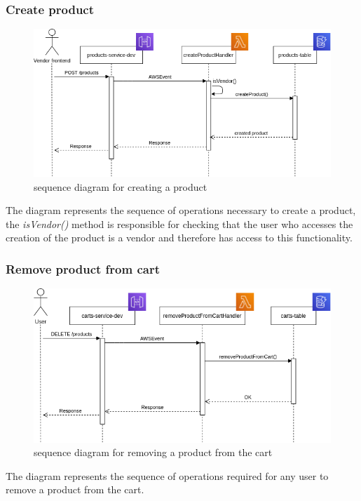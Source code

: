 \subsubsection{Create product}
\begin{figure}[!h]
    \vspace{5px}
    \includegraphics[scale=0.5]{../../../../Images/Diagrammi/maintainerManual/createProductSequence.png}
    \centering
    \caption{sequence diagram for creating a product} 
\end{figure}
The diagram represents the sequence of operations necessary to create a product, the \textit{isVendor()} method is responsible for checking that the user who accesses the creation of the product is a vendor and therefore has access to this functionality.
\pagebreak
\subsubsection{Remove product from cart}
\begin{figure}[!h]
    \vspace{5px}
    \includegraphics[scale=0.5]{../../../../Images/Diagrammi/maintainerManual/removeProductFromCart.png}
    \centering
    \caption{sequence diagram for removing a product from the cart} 
\end{figure}
The diagram represents the sequence of operations required for any user to remove a product from the cart.
\pagebreak
